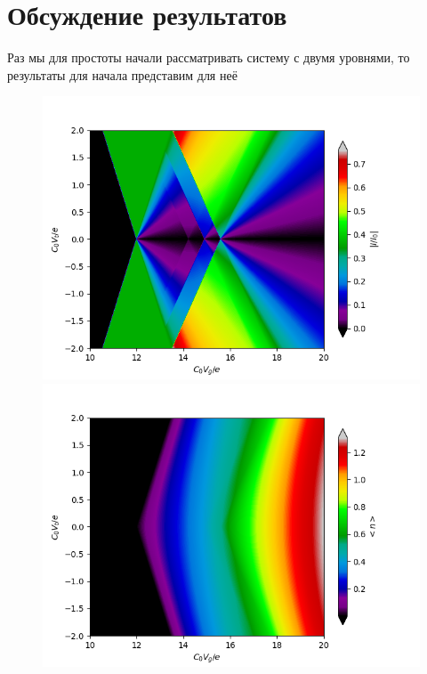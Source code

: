 \documentclass[12pt,a4paper]{report}
\begin{document}
\section{Обсуждение результатов}

Раз мы для простоты начали рассматривать систему с двумя уровнями, то результаты для начала представим для неё
\begin{figure}[h!]
\begin{floatrow}
           {\includegraphics[scale = 0.6]{current 2lvl}}
           {\includegraphics[scale = 0.6]{n 2lvl}}  
\end{floatrow}    
\end{figure}
\end{document}
